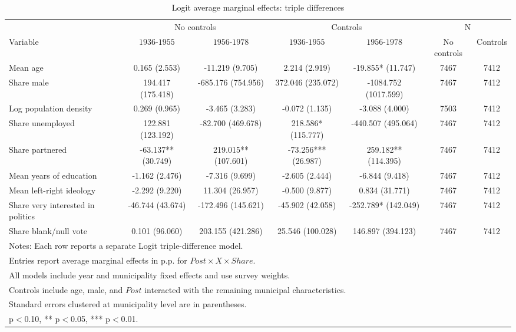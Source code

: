 \begin{table}[!htbp]
\centering
\caption{Logit average marginal effects: triple differences}
\label{tab:logit_triple_mfx}
\small
\begin{tabular}{lcccccc}
\hline
 & \multicolumn{2}{c}{No controls} & \multicolumn{2}{c}{Controls} & \multicolumn{2}{c}{N} \\
Variable & $1936$-$1955$ & $1956$-$1978$ & $1936$-$1955$ & $1956$-$1978$ & No controls & Controls \\
\hline
Mean age & 0.165 (2.553) & -11.219 (9.705) & 2.214 (2.919) & -19.855* (11.747) & 7467 & 7412 \\
Share male & 194.417 (175.418) & -685.176 (754.956) & 372.046 (235.072) & -1084.752 (1017.599) & 7467 & 7412 \\
Log population density & 0.269 (0.965) & -3.465 (3.283) & -0.072 (1.135) & -3.088 (4.000) & 7503 & 7412 \\
Share unemployed & 122.881 (123.192) & -82.700 (469.678) & 218.586* (115.777) & -440.507 (495.064) & 7467 & 7412 \\
Share partnered & -63.137** (30.749) & 219.015** (107.601) & -73.256*** (26.987) & 259.182** (114.395) & 7467 & 7412 \\
Mean years of education & -1.162 (2.476) & -7.316 (9.699) & -2.605 (2.444) & -6.844 (9.418) & 7467 & 7412 \\
Mean left-right ideology & -2.292 (9.220) & 11.304 (26.957) & -0.500 (9.877) & 0.834 (31.771) & 7467 & 7412 \\
Share very interested in politics & -46.744 (43.674) & -172.496 (145.621) & -45.902 (42.058) & -252.789* (142.049) & 7467 & 7412 \\
Share blank/null vote & 0.101 (96.060) & 203.155 (421.286) & 25.546 (100.028) & 146.897 (394.123) & 7467 & 7412 \\
\hline
\multicolumn{7}{l}{\footnotesize Notes: Each row reports a separate Logit triple-difference model.} \\
\multicolumn{7}{l}{\footnotesize Entries report average marginal effects in p.p. for $Post \times X \times Share$.} \\
\multicolumn{7}{l}{\footnotesize All models include year and municipality fixed effects and use survey weights.} \\
\multicolumn{7}{l}{\footnotesize Controls include age, male, and $Post$ interacted with the remaining municipal characteristics.} \\
\multicolumn{7}{l}{\footnotesize Standard errors clustered at municipality level are in parentheses.} \\
\multicolumn{7}{l}{\footnotesize * p$<$0.10, ** p$<$0.05, *** p$<$0.01.} \\
\end{tabular}
\end{table}
